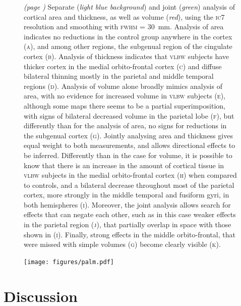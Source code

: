 \begin{figure}[!b]
\centering
\caption[Separate and joint analyses of cortical area, thickness, and volume comparing the \textsc{vlbw} and the coetaneous control groups.]{\emph{(page \pageref{fig:palm_noref})} Separate (\emph{light blue background}) and joint (\emph{green}) analysis of cortical area and thickness, as well as volume (\emph{red}), using the \textsc{ic}7 resolution and smoothing with \textsc{fwhm} = 30~mm. Analysis of area indicates no reductions in the control group anywhere in the cortex (\textsc{a}), and among other regions, the subgenual region of the cingulate cortex (\textsc{b}). Analysis of thickness indicates that \textsc{vlbw} subjects have thicker cortex in the medial orbito-frontal cortex (\textsc{c}) and diffuse bilateral thinning mostly in the parietal and middle temporal regions (\textsc{d}). Analysis of volume alone broadly mimics analysis of area, with no evidence for increased volume in \textsc{vlbw} subjects (\textsc{e}), although some maps there seems to be a partial superimposition, with signs of bilateral decreased volume in the parietal lobe (\textsc{f}), but differently than for the analysis of area, no signs for reductions in the subgenual cortex (\textsc{g}). Jointly analysing area and thickness gives equal weight to both measurements, and allows directional effects to be inferred. Differently than in the case for volume, it is possible to know that there is an increase in the amount of cortical tissue in \textsc{vlbw} subjects in the medial orbito-frontal cortex (\textsc{h}) when compared to controls, and a bilateral decrease throughout most of the parietal cortex, more strongly in the middle temporal and fusiform gyri, in both hemispheres (\textsc{i}). Moreover, the joint analysis allows search for effects that can negate each other, such as in this case weaker effects in the parietal region (\textsc{j}), that partially overlap in space with those shown in (\textsc{i}). Finally, strong effects in the middle orbito-frontal, that were missed with simple volumes (\textsc{g}) become clearly visible (\textsc{k}).}
\label{fig:palm}
\end{figure}

\begin{figure}[!p]
\centering
\texttt{[image: figures/palm.pdf]}
\label{fig:palm_noref}
\end{figure}

\section{Discussion}


